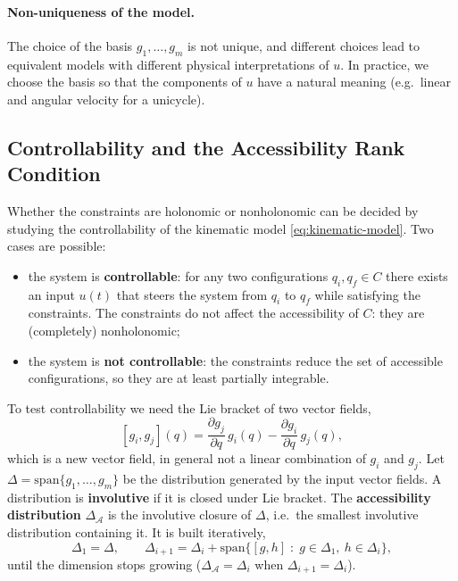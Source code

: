 \paragraph{Non-uniqueness of the model.}
The choice of the basis \( g_1, \dots, g_m \) is not unique, and
different choices lead to equivalent models with different physical
interpretations of \( u \). In practice, we choose the basis so that
the components of \( u \) have a natural meaning (e.g.\ linear and
angular velocity for a unicycle).

\subsection{Controllability and the Accessibility Rank Condition}
\label{subsec:controllability}

Whether the constraints are holonomic or nonholonomic can be decided by
studying the controllability of the kinematic model
\cref{eq:kinematic-model}. Two cases are possible:
\begin{itemize}
    \item the system is \textbf{controllable}: for any two
          configurations \( q_i, q_f \in C \) there exists an input
          \( u(t) \) that steers the system from \( q_i \) to
          \( q_f \) while satisfying the constraints. The constraints
          do not affect the accessibility of \( C \): they are
          (completely) nonholonomic;
    \item the system is \textbf{not controllable}: the constraints
          reduce the set of accessible configurations, so they are at
          least partially integrable.
\end{itemize}

To test controllability we need the Lie bracket of two vector fields,
\begin{equation}
\label{eq:lie-bracket}
    [g_i, g_j](q) = \frac{\partial g_j}{\partial q}\, g_i(q)
                  - \frac{\partial g_i}{\partial q}\, g_j(q),
\end{equation}
which is a new vector field, in general not a linear combination of
\( g_i \) and \( g_j \). Let \( \Delta = \text{span}\{g_1, \dots, g_m\} \)
be the distribution generated by the input vector fields. A
distribution is \textbf{involutive} if it is closed under Lie bracket.
The \textbf{accessibility distribution} \( \Delta_{\mathcal{A}} \) is
the involutive closure of \( \Delta \), i.e.\ the smallest involutive
distribution containing it. It is built iteratively,
\[
\Delta_1 = \Delta, \qquad
\Delta_{i+1} = \Delta_i + \text{span}\{ [g, h] \;:\; g \in \Delta_1,\ h \in \Delta_i \},
\]
until the dimension stops growing (\( \Delta_{\mathcal{A}} = \Delta_{i}
\) when \( \Delta_{i+1} = \Delta_i \)).

